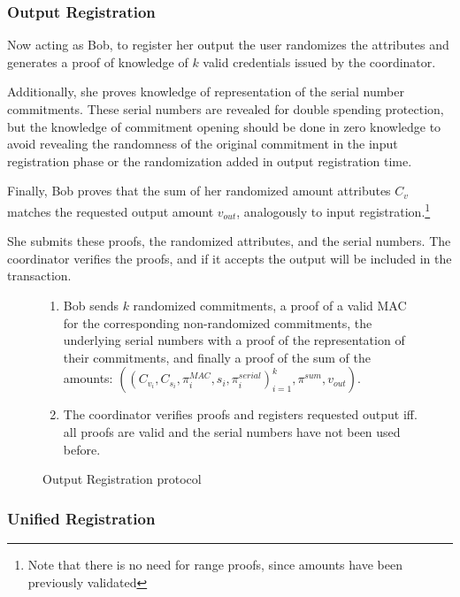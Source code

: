 \documentclass{article}
\begin{document}
\subsubsection{Output Registration}

Now acting as Bob, to register her output the user randomizes the attributes and generates a proof of knowledge of $k$ valid credentials issued by the coordinator.

Additionally, she proves knowledge of representation of the serial number commitments. These serial numbers are revealed for double spending protection, but the knowledge of commitment opening should be done in zero knowledge to avoid revealing the randomness of the original commitment in the input registration phase or the randomization added in output registration time.

Finally, Bob proves that the sum of her randomized amount attributes $C_v$ matches the requested output amount $v_{\mathit{out}}$, analogously to input registration.\footnote{Note that there is no need for range proofs, since amounts have been previously validated}

She submits these proofs, the randomized attributes, and the serial numbers. The coordinator verifies the proofs, and if it accepts the output will be included in the transaction.

\begin{figure}[h]
    \begin{mdframed}
    \begin{enumerate}
        \item Bob sends $k$ randomized commitments, a proof of a valid MAC for the corresponding non-randomized commitments, the underlying serial numbers with a proof of the representation of their commitments, and finally a proof of the sum of the amounts:   $((C_{v_i},C_{s_i},\pi_{i}^{\textit{MAC}},s_i, \pi_i^{\textit{serial}})^{k}_{i=1}, \pi^{\textit{sum}}, v_{\textit{out}})$.
        \item The coordinator verifies proofs and registers requested output iff. all proofs are valid and the serial numbers have not been used before.
    \end{enumerate}
\end{mdframed}
    \caption{Output Registration protocol}
    \label{fig:outputreg}
\end{figure}

\subsubsection{Unified Registration}
\end{document}

